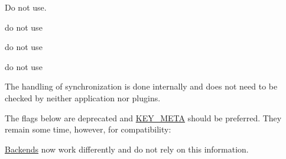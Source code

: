 
\begin{DoxyRefList}
\item[Member \mbox{\hyperlink{group__invoke_gaae89e2497eba478be2043f1b25adbb3c}{elektra\+Invoke\+Initialize}} (const char $\ast$elektra\+Plugin\+Name)]\label{deprecated__deprecated000005}%
%
Do not use. 
\item[Member \mbox{\hyperlink{classkdb_1_1tools_1_1Modules_ae8d8c91745c9f517e6e8a556f1664f69}{kdb\+::tools\+::Modules\+::load}} (std\+::string const \&plugin\+Name)]\label{deprecated__deprecated000006}%
%
do not use  
\item[Member \mbox{\hyperlink{classkdb_1_1tools_1_1Modules_a6ae72cc8e30fe3fb0aabd6f78fad8ddf}{kdb\+::tools\+::Modules\+::load}} (std\+::string const \&plugin\+Name, \mbox{\hyperlink{classkdb_1_1KeySet}{kdb\+::\+Key\+Set}} const \&config)]\label{deprecated__deprecated000007}%
%
do not use  
\item[Member \mbox{\hyperlink{group__key_gga9b703ca49f48b482def322b77d3e6bc8ab089c5e7977d6e58737eb586ee153b7f}{KEY\+\_\+\+NULL}} ]\label{deprecated__deprecated000001}%
%
do not use  
\item[Member \mbox{\hyperlink{group__keytest_gaf247df0de7aca04b32ef80e39ef12950}{key\+Need\+Sync}} (const \mbox{\hyperlink{classkdb_1_1Key}{Key}} $\ast$key)]\label{deprecated__deprecated000004}%
%
The handling of synchronization is done internally and does not need to be checked by neither application nor plugins. 
\item[Member \mbox{\hyperlink{group__key_gad23c65b44bf48d773759e1f9a4d43b89}{key\+New}} (const char $\ast$name,...)]\label{deprecated__deprecated000002}%
%
The flags below are deprecated and \mbox{\hyperlink{group__key_gga9b703ca49f48b482def322b77d3e6bc8a040582834bb2d90049947d7ef74e87e2}{KEY\+\_\+\+META}} should be preferred. They remain some time, however, for compatibility\+:  
\item[Member \mbox{\hyperlink{group__keyset_ga8f210432e664d8ba06d7d55a2aba2d0f}{ks\+Need\+Sync}} (const \mbox{\hyperlink{classkdb_1_1KeySet}{Key\+Set}} $\ast$ks)]\label{deprecated__deprecated000003}%
%
\mbox{\hyperlink{classkdb_1_1tools_1_1Backends}{Backends}} now work differently and do not rely on this information.
\end{DoxyRefList}